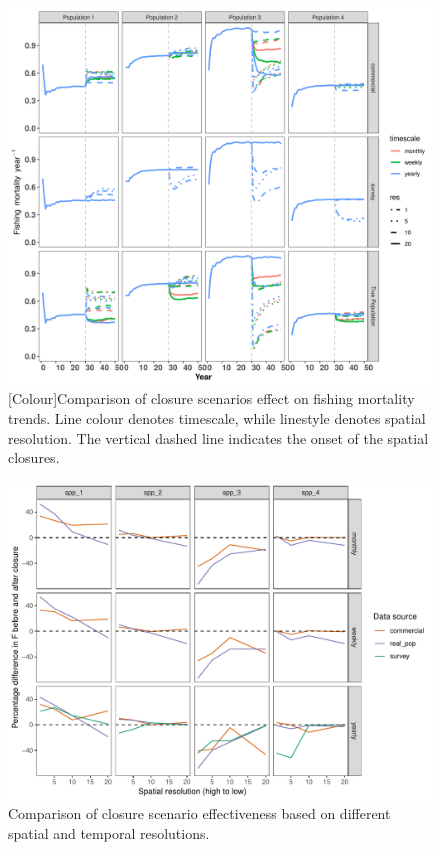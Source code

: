 \documentclass[review]{elsarticle}
\begin{document}
\begin{figure}[!ht]
	\includegraphics[width = \linewidth]{../analysis/F_trendsREV}
	\caption{[Colour]Comparison of closure scenarios effect on fishing mortality
		trends. Line colour denotes timescale, while linestyle
		denotes spatial resolution. The vertical dashed line
		indicates the onset of the spatial closures.}
	\label{fig:3}
\end{figure}

\begin{figure}[!ht]
	\includegraphics[width =\linewidth]{../analysis/f_diff_effectiveness}
	\caption{Comparison of closure scenario effectiveness based on
		different spatial and temporal resolutions.}
	\label{fig:4}
\end{figure}	
\end{document}
